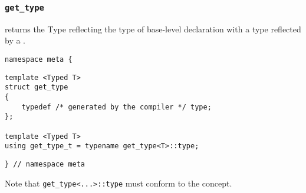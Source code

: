 

\subsubsection{\texttt{get\_type}}

returns the Type reflecting the type of base-level declaration with a type reflected by a .

\begin{verbatim}
namespace meta {
\end{verbatim}
\begin{verbatim}
template <Typed T>
struct get_type
{
	typedef /* generated by the compiler */ type;
};
	
template <Typed T>
using get_type_t = typename get_type<T>::type;

\end{verbatim}
\begin{verbatim}
} // namespace meta
\end{verbatim}


Note that \texttt{get\_type<...>::type}
must conform to the  concept.
